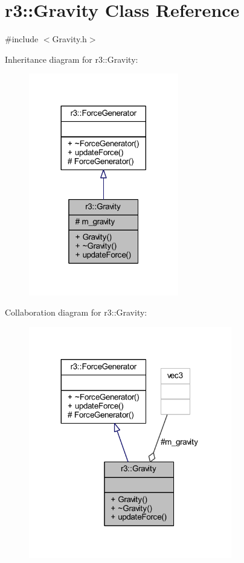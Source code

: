 \hypertarget{classr3_1_1_gravity}{}\section{r3\+:\+:Gravity Class Reference}
\label{classr3_1_1_gravity}


{\ttfamily \#include $<$Gravity.\+h$>$}



Inheritance diagram for r3\+:\+:Gravity\+:\nopagebreak
\begin{figure}[H]
\begin{center}
\leavevmode
\includegraphics[width=185pt]{classr3_1_1_gravity__inherit__graph}
\end{center}
\end{figure}


Collaboration diagram for r3\+:\+:Gravity\+:\nopagebreak
\begin{figure}[H]
\begin{center}
\leavevmode
\includegraphics[width=251pt]{classr3_1_1_gravity__coll__graph}
\end{center}
\end{figure}
